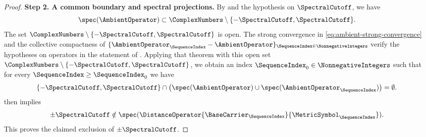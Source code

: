 \begin{proof}
\textbf{Step 2. A common boundary and spectral projections.}
By  and the hypothesis on
$\SpectralCutoff$,
we have
\[
 \spec(\AmbientOperator)
 \subset\ComplexNumbers\setminus\{-\SpectralCutoff,\SpectralCutoff\}.
\]
The set
$\ComplexNumbers\setminus\{-\SpectralCutoff,\SpectralCutoff\}$
is open.
The strong convergence in \eqref{eq:ambient-strong-convergence}
and the collective compactness of
$\{\AmbientOperator_\SequenceIndex-\AmbientOperator\}_{\SequenceIndex\in\NonnegativeIntegers}$
verify the hypotheses on operators in the statement of
.
Applying that theorem with this open set
$\ComplexNumbers\setminus\{-\SpectralCutoff,\SpectralCutoff\}$,
we obtain an index
$\SequenceIndex_0\in\NonnegativeIntegers$
such that for every
$\SequenceIndex\geq\SequenceIndex_0$
we have
\begin{equation}\label{eq:ambient-cutoff-exclusion}
 \{-\SpectralCutoff,\SpectralCutoff\}
 \cap\bigl(\spec(\AmbientOperator)\cup\spec(\AmbientOperator_\SequenceIndex)\bigr)
 =\emptyset.
\end{equation}
 then implies
\[
 \pm\SpectralCutoff
 \notin\spec(\DistanceOperator{\BaseCarrier_\SequenceIndex}{\MetricSymbol_\SequenceIndex}).
\]
This proves the claimed exclusion of
$\pm\SpectralCutoff$.


\end{proof}
